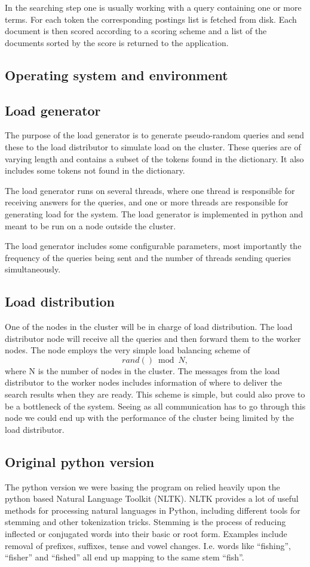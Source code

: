 In the searching step one is usually working with a query containing one or more terms. For each token the corresponding postings list is fetched from disk. Each document is then scored according to a scoring scheme and a list of the documents sorted by the score is returned to the application.\cite{IntroIR}


\subsection{Operating system and environment}
\subsection{Load generator}
The purpose of the load generator is to generate pseudo-random queries and send these to the load distributor to simulate load on the cluster. These queries are of varying length and contains a subset of the tokens found in the dictionary. It also includes some tokens not found in the dictionary.

The load generator runs on several threads, where one thread is responsible for receiving answers for the queries, and one or more threads are responsible for generating load for the system. The load generator is implemented in python and meant to be run on a node outside the cluster.

The load generator includes some configurable parameters, most importantly the frequency of the queries being sent and the number of threads sending queries simultaneously.

\subsection{Load distribution}
One of the nodes in the cluster will be in charge of load distribution. The load distributor node will receive all the queries and then forward them to the worker nodes.
The node employs the very simple load balancing scheme of $$rand() \bmod N,$$ where N is the number of nodes in the cluster.
The messages from the load distributor to the worker nodes includes information of where to deliver the search results when they are ready.
This scheme is simple, but could also prove to be a bottleneck of the system. Seeing as all communication has to go through this node we could end up with the performance of the cluster being limited by the load distributor.

\subsection{Original python version}
The python version we were basing the program on relied heavily upon the python based Natural Language Toolkit\cite{nltk} (NLTK).
NLTK provides a lot of useful methods for processing natural languages in Python, including different tools for stemming and other tokenization tricks.
Stemming is the process of reducing inflected or conjugated words into their basic or root form. Examples include removal of prefixes, suffixes, tense and vowel changes. I.e. words like ``fishing'', ``fisher'' and ``fished'' all end up mapping to the same stem ``fish''.

